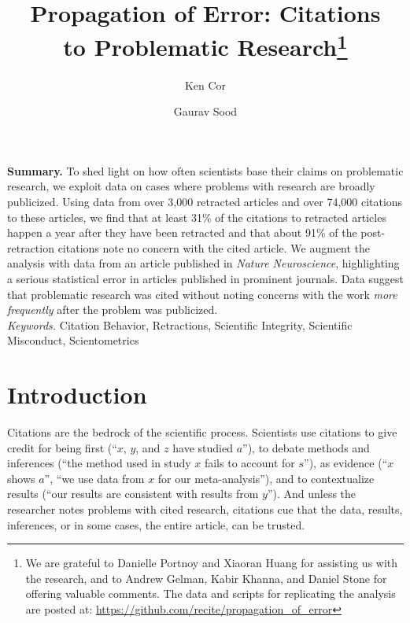 \documentclass[12pt, letterpaper]{article}
\begin{document}
\title{\Large{Propagation of Error: Citations\\ to Problematic Research}\footnote{We are grateful to Danielle Portnoy and Xiaoran Huang for assisting us with the research, and to Andrew Gelman, Kabir Khanna, and Daniel Stone for offering valuable comments. The data and scripts for replicating the analysis are posted at: \href{https://github.com/recite/propagation_of_error}{https://github.com/recite/propagation\_of\_error}}\\\vspace{5mm}}

\author{Ken Cor\\
\and Gaurav Sood}
\maketitle

\vspace{.2cm}
\doublespacing
\clearpage
\textbf{Summary.} To shed light on how often scientists base their claims on problematic research, we exploit data on cases where problems with research are broadly publicized. Using data from over 3,000 retracted articles and over 74,000 citations to these articles, we find that at least 31\% of the citations to retracted articles happen a year after they have been retracted and that about 91\% of the post-retraction citations note no concern with the cited article. We augment the analysis with data from an article published in \textit{Nature Neuroscience}, highlighting a serious statistical error in articles published in prominent journals. Data suggest that problematic research was cited without noting concerns with the work \textit{more frequently} after the problem was publicized.
\vspace{.2cm}\\
\singlespacing
\textit{Keywords.} Citation Behavior, Retractions, Scientific Integrity, Scientific Misconduct, Scientometrics
\doublespacing
\clearpage

\section{Introduction}

Citations are the bedrock of the scientific process. Scientists use citations to give credit for being first (``$x$, $y$, and $z$ have studied $a$''), to debate methods and inferences (``the method used in study $x$ fails to account for $s$''), as evidence (``$x$ shows $a$'', ``we use data from $x$ for our meta-analysis''), and to contextualize results (``our results are consistent with results from $y$''). And unless the researcher notes problems with cited research, citations cue that the data, results, inferences, or in some cases, the entire article, can be trusted.
\end{document}
